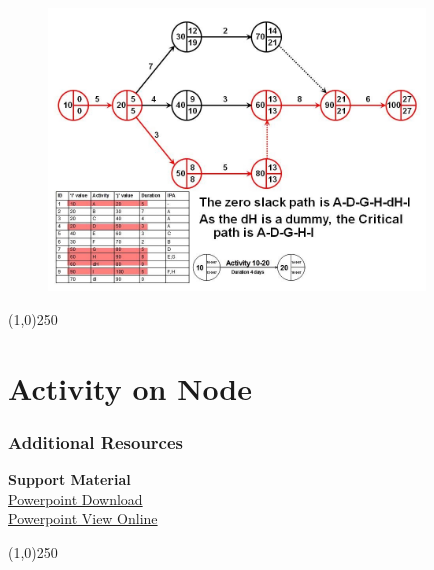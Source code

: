 \begin{frame}
\begin{figure}
	\centering
		\includegraphics[width = 10.0cm]{oldnotes/Slide122.jpg}
\end{figure}
\end{frame}
\begin{center}\line(1,0){250}\end{center}



\section{Activity on Node}

\begin{frame}
\frametitle{Additional Resources}
\textbf{Support Material}\\
\href{https://sites.google.com/site/paulveseyresourcefiles/project-management/Lecture\%2011\%20-\%20Project\%20Time\%20Management\%20AON\%204-8.pptx?attredirects=0&d=1}{Powerpoint Download}\\
\href{https://docs.google.com/viewer?a=v&pid=sites&srcid=ZGVmYXVsdGRvbWFpbnxwYXVsdmVzZXlyZXNvdXJjZWZpbGVzfGd4OjNlMzYwYmNkOWEyNzhhOTM}{Powerpoint View Online}\\
\end{frame}
\begin{center}\line(1,0){250}\end{center}



